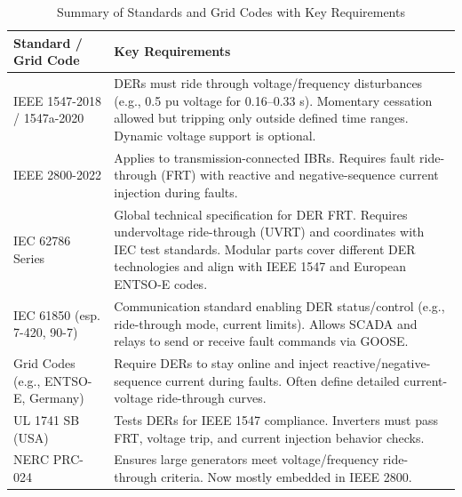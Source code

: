 \begin{table}[h]
    \centering
    \begin{tabular}{|>{\raggedright\arraybackslash}p{5cm}|>{\raggedright\arraybackslash}p{10cm}|}
        \hline
        \textbf{Standard / Grid Code} & \textbf{Key Requirements} \\ \hline
        IEEE 1547-2018 / 1547a-2020 & DERs must ride through voltage/frequency disturbances (e.g., 0.5 pu voltage for 0.16–0.33 s). Momentary cessation allowed but tripping only outside defined time ranges. Dynamic voltage support is optional. \\ \hline
        IEEE 2800-2022 & Applies to transmission-connected IBRs. Requires fault ride-through (FRT) with reactive and negative-sequence current injection during faults. \\ \hline
        IEC 62786 Series & Global technical specification for DER FRT. Requires undervoltage ride-through (UVRT) and coordinates with IEC test standards. Modular parts cover different DER technologies and align with IEEE 1547 and European ENTSO-E codes. \\ \hline
        IEC 61850 (esp. 7-420, 90-7) & Communication standard enabling DER status/control (e.g., ride-through mode, current limits). Allows SCADA and relays to send or receive fault commands via GOOSE. \\ \hline
        Grid Codes (e.g., ENTSO-E, Germany) & Require DERs to stay online and inject reactive/negative-sequence current during faults. Often define detailed current-voltage ride-through curves. \\ \hline
        UL 1741 SB (USA) & Tests DERs for IEEE 1547 compliance. Inverters must pass FRT, voltage trip, and current injection behavior checks. \\ \hline
        NERC PRC-024 & Ensures large generators meet voltage/frequency ride-through criteria. Now mostly embedded in IEEE 2800. \\ \hline
    \end{tabular}
    \caption{Summary of Standards and Grid Codes with Key Requirements}
    \label{tab:standards-key-requirements}
\end{table}






